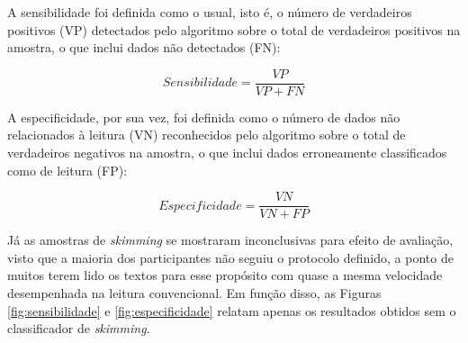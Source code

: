 \documentclass[12pt]{article}
\begin{document}
		A sensibilidade foi definida como o usual, isto é, o número de verdadeiros positivos (VP) detectados pelo algoritmo sobre o total de verdadeiros positivos na amostra, o que inclui dados não detectados (FN):
		
		$$Sensibilidade = \frac{VP}{VP + FN}$$
				
		A especificidade, por sua vez, foi definida como o número de dados não relacionados à leitura (VN) reconhecidos pelo algoritmo sobre o total de verdadeiros negativos na amostra, o que inclui dados erroneamente classificados como de leitura (FP):
		
		$$Especificidade = \frac{VN}{VN + FP}$$
		
		Já as amostras de \textit{skimming} se mostraram inconclusivas para efeito de avaliação, visto que a maioria dos participantes não seguiu o protocolo definido, a ponto de muitos terem lido os textos para esse propósito com quase a mesma velocidade desempenhada na leitura convencional. Em função disso, as Figuras \ref{fig:sensibilidade} e \ref{fig:especificidade} relatam apenas os resultados obtidos sem o classificador de \textit{skimming}.
		
\end{document}
